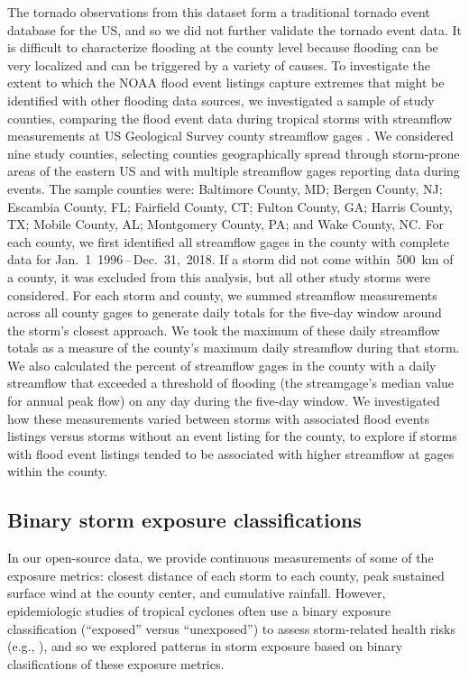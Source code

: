 The tornado observations from this dataset form a traditional tornado event
database for the \ac{US}, and so we did not further validate
the tornado event data. It is difficult to characterize flooding at the county
level because flooding can be very localized and can be triggered by a variety
of causes. To investigate the extent to which the NOAA flood event listings
capture extremes that might be identified with other flooding data sources, we
investigated a sample of study counties, comparing the flood event data during
tropical storms with streamflow measurements at \ac{US} Geological Survey
county streamflow gages \parencite{usgsgages, countyfloods, dataRetrieval}.  
We considered nine study counties, selecting counties geographically spread
through storm-prone areas of the eastern \ac{US} and with multiple streamflow
gages reporting data during events. The sample counties were: Baltimore County,
MD; Bergen County, NJ; Escambia County, FL; Fairfield County, CT; Fulton
County, GA; Harris County, TX; Mobile County, AL; Montgomery County, PA; and
Wake County, NC. For each county, we first identified all streamflow gages in
the county with complete data for Jan.~1~1996\,--\,Dec.~31,~2018. If a storm
did not come within~500~\si{\kilo\metre} of a county, it was excluded from this
analysis, but all other study storms were considered. 
For each storm and county, we summed streamflow measurements across all county
gages to generate daily totals for the five-day window around the storm's
closest approach. We took the maximum of these daily streamflow totals as a
measure of the county's maximum daily streamflow during that storm. We also
calculated the percent of streamflow gages in the county with a daily
streamflow that exceeded a threshold of flooding (the streamgage's median value
for annual peak flow) on any day during the five-day
window. We investigated how these measurements varied between storms with
associated flood events listings versus storms without an
event listing for the county, to explore if storms with flood event listings
tended to be associated with higher streamflow at gages within the county.

\subsection*{Binary storm exposure classifications}

In our open-source data, we provide continuous measurements of some of the
exposure metrics: closest distance of each storm to each county, peak sustained
surface wind at the county center, and cumulative rainfall. However,
epidemiologic studies of tropical cyclones often use a binary exposure
classification (``exposed'' versus ``unexposed'') to assess storm-related
health risks (e.g., \textcite{grabich2015, mckinney2011,
caillouet2008increase}), and so we explored patterns in storm exposure based on
binary clasifications of these exposure metrics. 

